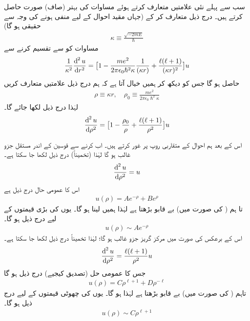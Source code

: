  سب سے پہلے نئی علامتیں متعارف کرتے ہوئے مساوات کی بہتر (صاف) صورت حاصل کرتے ہیں۔ درج ذیل متعارف کر کے (جہاں مقید احوال کے لیے  منفی ہونے کی وجہ سے  حقیقی ہو گا)
 \begin{align}\label{مساوات_ابعادی_متعارف_الف}
\kappa \equiv \frac{\sqrt{-2mE}}{\hslash} 
\end{align}
 مساوات  کو  سے تقسیم کرنے سے
\begin{align*}
\frac{1}{\kappa ^{2}}\frac{\dif^{\,2}{u}}{\dif{r^{2}}}=\big[1-\frac{me^{2}}{2\pi\epsilon_{0}\hslash^{2}\kappa }\frac{1}{(\kappa r)}+\frac{\ell(\ell+1)}{(\kappa r)^{2}}\big]u 
\end{align*}
حاصل ہو گا جس کو دیکھ کر ہمیں خیال آتا ہے کہ ہم درج ذیل علامتیں متعارف کریں 
\begin{align}\label{مساوات_ابعادی_متعارف_ب}
\rho\equiv \kappa r, \quad \rho_{0}\equiv\frac{me^{2}}{2\pi\epsilon_{0}\hslash^{2}\kappa } 
\end{align}
لہٰذا درج ذیل لکھا جائے گا۔
\begin{align}\label{مساوات_ابعادی_رداسی_کولمب_نئے_متغیرات}
\frac{\dif^{\,2}{u}}{\dif{\rho^{2}}}=\big[1-\frac{\rho_{0}}{\rho}+\frac{\ell(\ell+1)}{\rho^{2}}\big]u 
\end{align}

اس کے بعد ہم احوال کے متقاربی روپ پر غور کرتے ہیں۔ اب  کرنے سے قوسین کے اندر مستقل جزو غالب ہو گا لہٰذا (تخمیناً) درج ذیل لکھا جا سکتا ہے۔
\begin{align*}
\frac{\dif^{\,2}{u}}{\dif{\rho^{2}}}=u 
\end{align*}
اس کا عمومی حال درج ذیل ہے
\begin{align}\label{مساوات_ابعاد_عمومی_حل_بے_قابو}
u(\rho)=Ae^{-\rho}+Be^{\rho} 
\end{align}
تا ہم ( کی صورت میں)  بے قابو بڑھتا ہے لہٰذا ہمیں  لینا ہو گا۔ یوں  کی بڑی قیمتوں کے لیے درج ذیل ہو گا۔
\begin{align}
u(\rho)\sim Ae^{-\rho} 
\end{align}
اس کے برعکس  کی صورت میں مرکز گریز جزو غالب ہو گا؛ لہٰذا تخمیناً درج ذیل لکھا جا سکتا ہے۔ 
\begin{align*}
\frac{\dif^{\,2}{u}}{\dif{\rho^{2}}}=\frac{\ell(\ell+1)}{\rho^{2}}u 
\end{align*}
 جس کا عمومی حل (تصدیق کیجیے) درج ذیل ہو گا
 \begin{align*}
u(\rho)=C\rho^{\ell+1}+D\rho^{-\ell} 
\end{align*}
 تاہم ( کی صورت میں)  بے قابو بڑھتا ہے لہٰذا  ہو گا۔ یوں  کی چھوٹی قیمتوں کے لیے درج ذیل ہو گا۔
 \begin{align}\label{مساوات_ابعادی_ہائیڈروجن_مبدا_قریب}
u(\rho)\sim C\rho^{\ell+1} 
\end{align}

